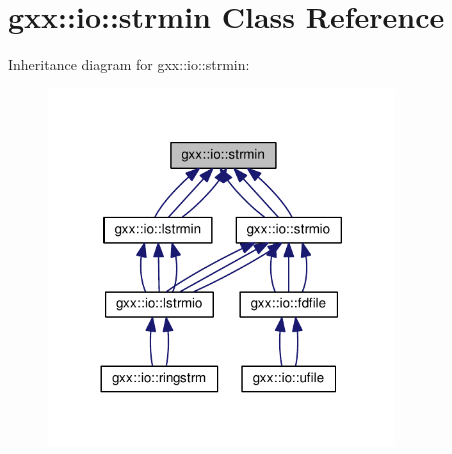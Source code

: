 \hypertarget{classgxx_1_1io_1_1strmin}{}\section{gxx\+:\+:io\+:\+:strmin Class Reference}
\label{classgxx_1_1io_1_1strmin}


Inheritance diagram for gxx\+:\+:io\+:\+:strmin\+:
\nopagebreak
\begin{figure}[H]
\begin{center}
\leavevmode
\includegraphics[width=260pt]{classgxx_1_1io_1_1strmin__inherit__graph}
\end{center}
\end{figure}
